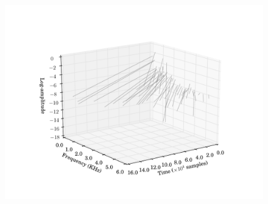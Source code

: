 \begin{figure}[!t]
    \centering
    \includegraphics[width=\figwidthscale\textwidth]{plots/partial_classification_acgtr_xylo_partial_trajectories.pdf}
    \CaptionWithTitle{%
    }{\label{plot:parclassaxpartialtrajectories}}
\end{figure}

